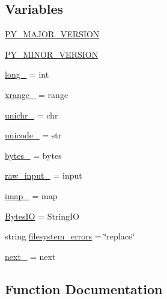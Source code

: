 \subsection*{Variables}
\begin{DoxyCompactItemize}
\item 
\hyperlink{namespacepygame_1_1compat_a1bc59efacf82f77446425e8b6cb32bc9}{P\+Y\+\_\+\+M\+A\+J\+O\+R\+\_\+\+V\+E\+R\+S\+I\+ON}
\item 
\hyperlink{namespacepygame_1_1compat_abf8b1f90c96091106a9a414753a39483}{P\+Y\+\_\+\+M\+I\+N\+O\+R\+\_\+\+V\+E\+R\+S\+I\+ON}
\item 
\hyperlink{namespacepygame_1_1compat_a98a2dce47e968c199ca2b399466be729}{long\+\_\+} = int
\item 
\hyperlink{namespacepygame_1_1compat_acc372c91e86f98430505f4a3aa47b0e8}{xrange\+\_\+} = range
\item 
\hyperlink{namespacepygame_1_1compat_aabdec0f124250de0e7f3115f170f4601}{unichr\+\_\+} = chr
\item 
\hyperlink{namespacepygame_1_1compat_ae26944d6ea0e3c477dc3af91e783723e}{unicode\+\_\+} = str
\item 
\hyperlink{namespacepygame_1_1compat_a045d025c643a534c4aeb0acbf36ed1f4}{bytes\+\_\+} = bytes
\item 
\hyperlink{namespacepygame_1_1compat_a6551a3a10a56780ab41f891d39b66cef}{raw\+\_\+input\+\_\+} = input
\item 
\hyperlink{namespacepygame_1_1compat_a0bdfae5ee82beeb6c589d8dc5b6d178c}{imap\+\_\+} = map
\item 
\hyperlink{namespacepygame_1_1compat_a60afb56b54f01a270b35404d4ebdafb5}{Bytes\+IO} = String\+IO
\item 
string \hyperlink{namespacepygame_1_1compat_ac4b84be1e0cb908a79a95a18b61673b0}{filesystem\+\_\+errors} = \char`\"{}replace\char`\"{}
\item 
\hyperlink{namespacepygame_1_1compat_a0c32baa0623c1f05d8d89e870127cf3b}{next\+\_\+} = next
\end{DoxyCompactItemize}


\subsection{Function Documentation}
\mbox{\label{namespacepygame_1_1compat_a43db8b2f1d746ab728fda67afe4ed79e}} 
